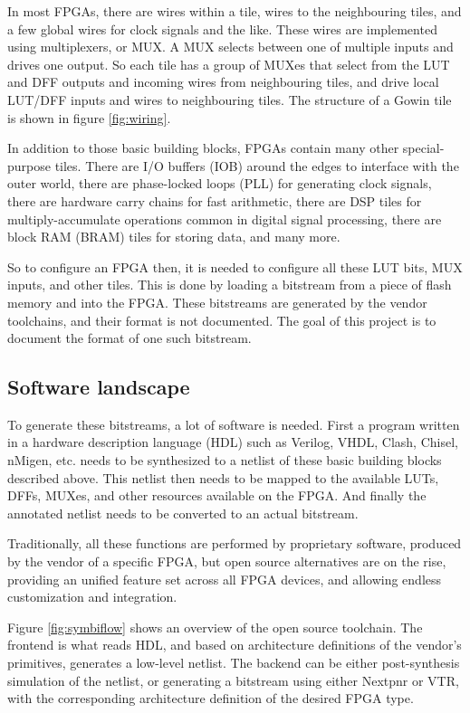 \documentclass{article}
\begin{document}
In most FPGAs, there are wires within a tile, wires to the neighbouring tiles, and a few global wires for clock signals and the like. These wires are implemented using multiplexers, or MUX. A MUX selects between one of multiple inputs and drives one output. So each tile has a group of MUXes that select from the LUT and DFF outputs and incoming wires from neighbouring tiles, and drive local LUT/DFF inputs and wires to neighbouring tiles. The structure of a Gowin tile is shown in figure \ref{fig:wiring}.

In addition to those basic building blocks, FPGAs contain many other special-purpose tiles. There are I/O buffers (IOB) around the edges to interface with the outer world, there are phase-locked loops (PLL) for generating clock signals, there are hardware carry chains for fast arithmetic, there are DSP tiles for multiply-accumulate operations common in digital signal processing, there are block RAM (BRAM) tiles for storing data, and many more.

So to configure an FPGA then, it is needed to configure all these LUT bits, MUX inputs, and other tiles. This is done by loading a bitstream from a piece of flash memory and into the FPGA. These bitstreams are generated by the vendor toolchains, and their format is not documented. The goal of this project is to document the format of one such bitstream.

\subsection{Software landscape}

To generate these bitstreams, a lot of software is needed. First a program written in a hardware description language (HDL) such as Verilog, VHDL, Clash\cite{clash}, Chisel\cite{chisel}, nMigen\cite{nmigen}, etc. needs to be synthesized to a netlist of these basic building blocks described above. This netlist then needs to be mapped to the available LUTs, DFFs, MUXes, and other resources available on the FPGA. And finally the annotated netlist needs to be converted to an actual bitstream.

Traditionally, all these functions are performed by proprietary software, produced by the vendor of a specific FPGA, but open source alternatives are on the rise, providing an unified feature set across all FPGA devices, and allowing endless customization and integration.

Figure \ref{fig:symbiflow} shows an overview of the open source toolchain. The frontend is what reads HDL, and based on architecture definitions of the vendor's primitives, generates a low-level netlist. The backend can be either post-synthesis simulation of the netlist, or generating a bitstream using either Nextpnr or VTR\cite{Rose:2012:VPA:2145694.2145708}, with the corresponding architecture definition of the desired FPGA type.
\end{document}
